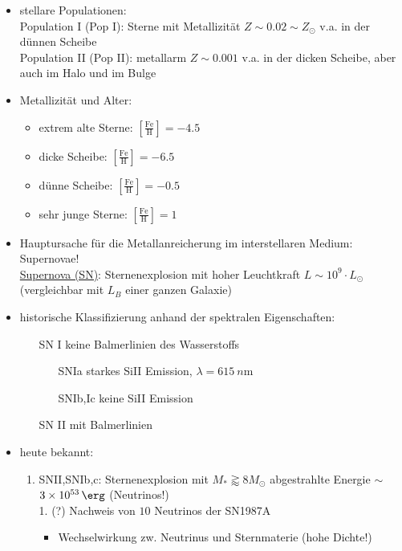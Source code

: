 \begin{itemize}
	\item stellare Populationen:\\
		Population I (Pop I): Sterne mit Metallizität $Z\sim\num{0.02}\sim Z_\odot$ v.a. in der dünnen Scheibe\\
		Population II (Pop II): metallarm $Z\sim\num{0.001}$ v.a. in der dicken Scheibe, aber auch im Halo und im Bulge
	\item Metallizität und Alter:
		\begin{itemize}[label=$\cdot$]
			\item extrem alte Sterne: $\left[\frac{\text{Fe}}{\text{H}}\right]=-\num{4.5}$
			\item dicke Scheibe: $\left[\frac{\text{Fe}}{\text{H}}\right]=-\num{6.5}$
			\item dünne Scheibe: $\left[\frac{\text{Fe}}{\text{H}}\right]=-\num{0.5}$
			\item sehr junge Sterne: $\left[\frac{\text{Fe}}{\text{H}}\right]=\num{1}$
		\end{itemize}
	\item Hauptursache für die Metallanreicherung im interstellaren Medium: Supernovae!\\
		\underline{Supernova (SN)}: Sternenexplosion mit hoher Leuchtkraft $L\sim 10^9\cdot L_\odot$ (vergleichbar mit $L_B$ einer ganzen Galaxie)
	\item historische Klassifizierung anhand der spektralen Eigenschaften:
		\begin{itemize}
			\item[SN I] keine Balmerlinien des Wasserstoffs
				\begin{itemize}
					\item[SNIa] starkes SiII Emission, $\lambda=\SI{615}{n\m}$
					\item[SNIb,Ic] keine SiII Emission
				\end{itemize}
			\item[SN II] mit Balmerlinien
		\end{itemize}
	\item heute bekannt:
		\begin{enumerate}[label={$(\roman*)$}]
			\item SNII,SNIb,c: Sternenexplosion mit $M_\ast\gtrapprox 8M_\odot$ abgestrahlte Energie $\sim$ $\SI{3e53}{\erg}$ (Neutrinos!)\\
				1. (?) Nachweis von $\num{10}$ Neutrinos der SN1987A
				\begin{itemize}[label={$\to$}]
					\item Wechselwirkung zw. Neutrinus und Sternmaterie (hohe Dichte!)

\end{itemize}
\end{enumerate}
\end{itemize}
